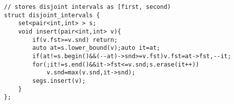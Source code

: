 \begin{verbatim}
// stores disjoint intervals as [first, second)
struct disjoint_intervals {
	set<pair<int,int> > s;
	void insert(pair<int,int> v){
		if(v.fst>=v.snd) return;
		auto at=s.lower_bound(v);auto it=at;
		if(at!=s.begin()&&(--at)->snd>=v.fst)v.fst=at->fst,--it;
		for(;it!=s.end()&&it->fst<=v.snd;s.erase(it++))
			v.snd=max(v.snd,it->snd);
		segs.insert(v);
	}
};
\end{verbatim}